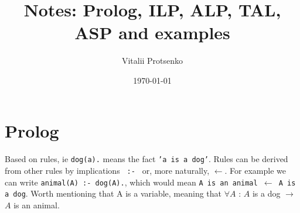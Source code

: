 \documentclass[11pt]{article}
\begin{document}
\title{Notes: Prolog, ILP, ALP, TAL, ASP and examples}

\author{Vitalii Protsenko}

\date{\today}         %

\maketitle

\section{Prolog}

\paragraph{}

Based on rules, ie \texttt{dog(a).} means the fact \texttt{'a is a dog'}.
Rules can be derived from other rules by implications \texttt{ :- } or, more naturally,  $\leftarrow$. For example we can write \texttt{animal(A) :- dog(A).}, which would mean \texttt{A is an animal $\leftarrow$ A is a dog}. Worth mentioning that A is a variable, meaning that $\forall A$ : $A$ is a dog $\rightarrow$ $A$ is an animal.
\end{document}
